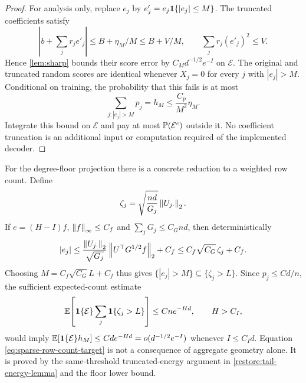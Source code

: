 \begin{proof}
For analysis only, replace $e_j$ by
$e'_j=e_j\mathbf1\{|e_j|\le M\}$. The truncated coefficients satisfy
\[
 \left|b+\sum_jr_je'_j\right|
 \le B+\eta_M/M\le B+V/M,\qquad
 \sum_jr_j(e'_j)^2\le V.
\]
Hence \cref{lem:sharp} bounds their score error by
$C_Md^{-1/2}e^{-I}$ on $\mathcal E$.
The original and truncated random scores are identical whenever
$X_j=0$ for every $j$ with $|e_j|>M$. Conditional on training, the
probability that this fails is at most
\[
 \sum_{j:|e_j|>M}p_j
 =h_M\le \frac{C_p}{M^2}\eta_M.
\]
Integrate this bound on $\mathcal E$ and pay at most
$\mathbb P(\mathcal E^c)$ outside it. No coefficient truncation is an
additional input or computation required of the implemented decoder.
\end{proof}

For the degree-floor projection there is a concrete reduction to a
weighted row count. Define
\[
 \zeta_j=\sqrt{\frac{nd}{G_j}}\left\lVert U_{j\cdot}\right\rVert_2.
\]
If $e=(H-I)f$, $\left\lVert f\right\rVert_\infty\le C_f$ and
$\sum_jG_j\le C_Gnd$, then deterministically
\[
 |e_j|
 \le \frac{\left\lVert U_{j\cdot}\right\rVert_2}{\sqrt{G_j}}
        \left\lVert U^\top G^{1/2}f\right\rVert_2+C_f
 \le C_f\sqrt{C_G}\,\zeta_j+C_f.
\]
Choosing $M=C_f\sqrt{C_G}L+C_f$ thus gives
$\{|e_j|>M\}\subseteq\{\zeta_j>L\}$. Since $p_j\le Cd/n$,
the sufficient expected-count estimate
\begin{equation}\label{eq:sparse-row-count-target}
 \mathbb E\!\left[\mathbf1\{\mathcal E\}
       \sum_j\mathbf1\{\zeta_j>L\}\right]\le Cne^{-Hd},
 \qquad H>C_I,
\end{equation}
would imply
$\mathbb E[\mathbf1\{\mathcal E\}h_M]\le Cd e^{-Hd}
=o(d^{-1/2}e^{-I})$ whenever $I\le C_Id$.
Equation \eqref{eq:sparse-row-count-target} is not a consequence of
aggregate geometry alone. It is proved by the same-threshold
truncated-energy argument in \cref{restore:tail-energy-lemma}
and the floor lower bound.

